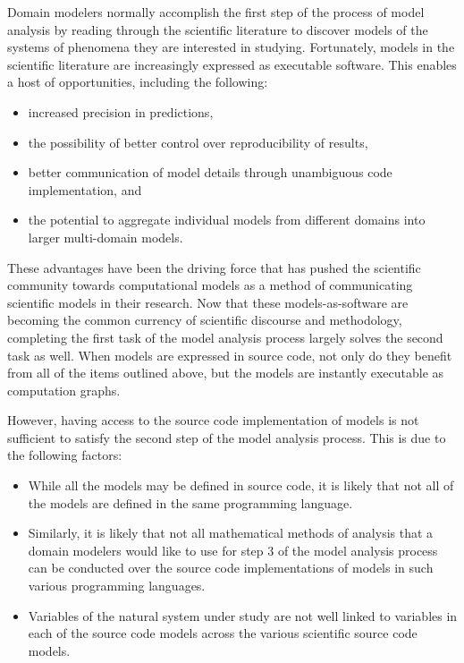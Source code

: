 Domain modelers normally accomplish the first step of the process of model analysis by reading through the scientific literature to discover models of the systems of phenomena they are interested in studying.
Fortunately, models in the scientific literature are increasingly expressed as executable software.
This enables a host of opportunities, including the following:
\begin{itemize}
\item increased precision in predictions,
\item the possibility of better control over reproducibility of results,
\item better communication of model details through unambiguous code implementation, and
\item the potential to aggregate individual models from different domains into larger multi-domain models.
\end{itemize}
These advantages have been the driving force that has pushed the scientific community towards computational models as a method of communicating scientific  models in their research.
Now that these models-as-software are becoming the common currency of scientific discourse and methodology, completing the first task of the model analysis process largely solves the second task as well.
When models are expressed in source code, not only do they benefit from all of the items outlined above, but the models are instantly executable as computation graphs.

However, having access to the source code implementation of models is not sufficient to satisfy the second step of the model analysis process.
This is due to the following factors:
\begin{itemize}
  \item While all the models may be defined in source code, it is likely that not all of the models are defined in the same programming language.
  \item Similarly, it is likely that not all mathematical methods of analysis that a domain modelers would like to use for step 3 of the model analysis process can be conducted over the source code implementations of models in such various programming languages.
  \item Variables of the natural system under study are not well linked to variables in each of the source code models across the various scientific source code models.
\end{itemize}

